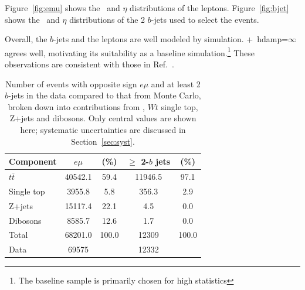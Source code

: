 Figure~\ref{fig:emu} shows the \pt\ and $\eta$ distributions of the leptons. 
Figure~\ref{fig:bjet} shows the \pt\ and $\eta$ distributions of the 2 $b$-jets used to select the events. 

Overall, the $b$-jets and the leptons are well modeled by simulation. \pow+\py\ hdamp=$\infty$ agrees  well, motivating its suitability as a baseline simulation.\footnote{The baseline sample is primarily chosen for high statistics} These observations are consistent with those in Ref.~\cite{xsecnote}.

\begin{table}[htp]
\centering
\begin{tabular}{|l|cc|cc|}\hline
Component & $e\mu$ & (\%) & $\geq$ 2-$b$ jets & (\%) \\ \hline
$t\bar{t}$ 	& 40542.1	& 59.4 	& 11946.5 &	97.1 \\
Single top 	& 3955.8	& 5.8	& 356.3 &	2.9 \\
Z+jets 		& 15117.4 	& 22.1	& 4.5 	&	0.0 \\
Dibosons 	& 8585.7 	& 12.6 	& 1.7	&	0.0 \\
\hline
Total & 68201.0 & 100.0 & 12309	& 100.0 \\
\hline
Data & 69575 &  & 12332 &   \\
\hline \hline 
\end{tabular}
\caption{Number of events with opposite sign $e\mu$ and at least 2 $b$-jets in the data  compared to that from Monte Carlo, broken down into contributions from \ttbar, $Wt$ single top, Z+jets and dibosons. Only central values are shown here;  systematic uncertainties are discussed in Section~\ref{sec:syst}.}
\label{t:sel}
\end{table}


